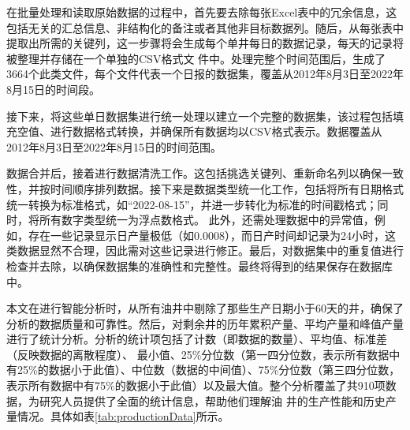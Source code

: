 在批量处理和读取原始数据的过程中，首先要去除每张Excel表中的冗余信息，这包括无关的汇总信息、非结构化的备注或者其他非目标数据列。随后，从每张表中提取出所需的关键列，这一步骤将会生成每个单井每日的数据记录，每天的记录将被整理并存储在一个单独的CSV格式文
件中。处理完整个时间范围后，生成了3664个此类文件，每个文件代表一个日报的数据集，覆盖从2012年8月3日至2022年8月15日的时间段。

接下来，将这些单日数据集进行统一处理以建立一个完整的数据集，该过程包括填充空值、进行数据格式转换，并确保所有数据均以CSV格式表示。数据覆盖从2012年8月3日至2022年8月15日的时间范围。

数据合并后，接着进行数据清洗工作。这包括挑选关键列、重新命名列以确保一致性，并按时间顺序排列数据。接下来是数据类型统一化工作，包括将所有日期格式统一转换为标准格式，如“2022-08-15”，并进一步转化为标准的时间戳格式；同时，将所有数字类型统一为浮点数格式。
此外，还需处理数据中的异常值，例如，存在一些记录显示日产量极低（如0.0008），而日产时间却记录为24小时，这类数据显然不合理，因此需对这些记录进行修正。最后，对数据集中的重复值进行检查并去除，以确保数据集的准确性和完整性。最终将得到的结果保存在数据库中。

本文在进行智能分析时，从所有油井中剔除了那些生产日期小于60天的井，确保了分析的数据质量和可靠性。然后，对剩余井的历年累积产量、平均产量和峰值产量进行了统计分析。分析的统计项包括了计数（即数据的数量）、平均值、标准差（反映数据的离散程度）、
最小值、25\%分位数（第一四分位数，表示所有数据中有25\%的数据小于此值）、中位数（数据的中间值）、75\%分位数（第三四分位数，表示所有数据中有75\%的数据小于此值）以及最大值。整个分析覆盖了共910项数据，为研究人员提供了全面的统计信息，帮助他们理解油
井的生产性能和历史产量情况。具体如表\ref{tab:productionData}所示。
\begin{table}[H]
    \renewcommand{\arraystretch}{1.5} %
    \centering
    \caption{产量统计数据表}
    \label{tab:productionData}
\end{table}

